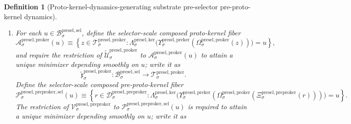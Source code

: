 \documentclass[11pt]{article}
\newcommand{\PreSectionSelectorBody}[1]{\mathcal B_{#1}^{\mathrm{presel,sel}}}
\newcommand{\KernelSpace}[1]{\mathcal H_{#1}^{\mathrm{presel,ker}}}
\newcommand{\KernelBody}[1]{\mathcal K_{#1}^{\mathrm{presel,ker}}}
\newcommand{\KernelProj}[1]{\Lambda_{#1}^{\mathrm{presel,ker}}}
\newcommand{\KernelFiber}[2]{\mathcal J_{#1}^{\mathrm{presel,ker}}(#2)}
\newcommand{\PreKernelProj}[1]{\Upsilon_{#1}^{\mathrm{presel,preker}}}
\newcommand{\PreKernelFiber}[2]{\mathcal U_{#1}^{\mathrm{presel,preker}}(#2)}
\newcommand{\ProtoKernelBody}[1]{\mathcal T_{#1}^{\mathrm{presel,proker}}}
\newcommand{\ProtoKernelProj}[1]{\Omega_{#1}^{\mathrm{presel,proker}}}
\newcommand{\ProtoKernelSelectorFiber}[2]{\mathcal A_{#1}^{\mathrm{presel,proker}}(#2)}
\newcommand{\PreProtoKernelBody}[1]{\mathcal D_{#1}^{\mathrm{presel,preproker}}}
\newcommand{\PreProtoKernelProj}[1]{\Xi_{#1}^{\mathrm{presel,preproker}}}
\newcommand{\PreProtoKernelFunctional}[1]{\mathscr V_{#1}^{\mathrm{presel,preproker}}}
\newcommand{\PreProtoKernelKernelFiber}[2]{\mathcal N_{#1}^{\mathrm{presel,preproker,ker}}(#2)}
\newcommand{\PreProtoKernelKernelMin}[1]{\mathfrak b_{#1}^{\mathrm{presel,preproker}}}
\newcommand{\PreProtoKernelSelectorFiber}[2]{\mathcal P_{#1}^{\mathrm{presel,preproker,sel}}(#2)}
\newcommand{\InducedKernelFunctional}[1]{\widetilde{\mathscr R}_{#1}^{\mathrm{presel,ker}}}
\newcommand{\InducedKernelMinLift}[1]{\widetilde{\mathfrak r}_{#1}^{\mathrm{presel,ker}}}
\newcommand{\InducedPreKernelFunctional}[1]{\widetilde{\mathscr S}_{#1}^{\mathrm{presel,preker}}}
\newcommand{\InducedPreKernelMinLift}[1]{\widetilde{\mathfrak s}_{#1}^{\mathrm{presel,preker}}}
\newcommand{\InducedProtoKernelFunctional}[1]{\widetilde{\mathscr U}_{#1}^{\mathrm{presel,proker}}}
\newcommand{\InducedProtoKernelKernelMin}[1]{\widetilde{\mathfrak w}_{#1}^{\mathrm{presel,proker}}}
\newcommand{\InducedProtoKernelSelectorMin}[1]{\widetilde{\mathfrak x}_{#1}^{\mathrm{presel,proker}}}
\newtheorem{definition}{Definition}
\begin{document}
\begin{definition}[Proto-kernel-dynamics-generating substrate pre-selector pre-proto-kernel dynamics]
\begin{enumerate}
    \[
    \InducedProtoKernelKernelMin{\sigma}:\KernelBody{\sigma}\to\ProtoKernelBody{\sigma}.
    \]
    Define the current-kernel-scale composed pre-proto-kernel fiber
    \[
    \PreProtoKernelKernelFiber{\sigma}{w}
    \equiv
    \left\{
    r\in\PreProtoKernelBody{\sigma}:
    \PreKernelProj{\sigma}\bigl(\ProtoKernelProj{\sigma}(\PreProtoKernelProj{\sigma}(r))\bigr)=w
    \right\}.
    \]
    The restriction of \(\PreProtoKernelFunctional{\sigma}\) to \(\PreProtoKernelKernelFiber{\sigma}{w}\) is required to attain a unique minimizer depending smoothly on \(w\); write it as
    \[
    \PreProtoKernelKernelMin{\sigma}:\KernelBody{\sigma}\to\PreProtoKernelBody{\sigma}.
    \]
    Define the induced current kernel functional
    \[
    \InducedKernelFunctional{\sigma}:\KernelSpace{\sigma}\to[0,\infty)
    \]
    by
    \[
    \InducedKernelFunctional{\sigma}(w)
    \equiv
    \InducedPreKernelFunctional{\sigma}\bigl(\InducedPreKernelMinLift{\sigma}(w)\bigr)
    =
    \min_{q\in\PreKernelFiber{\sigma}{w}}
    \InducedPreKernelFunctional{\sigma}(q)
    \qquad
    \text{for every }
    w\in\KernelBody{\sigma}.
    \]
    This function is required to be smooth on the ambient current kernel state space, and for every \(u\in\PreSectionSelectorBody{\sigma}\), its restriction to \(\KernelFiber{\sigma}{u}\) is required to be strictly convex and to attain a unique minimizer depending smoothly on \(u\); write it as
    \[
    \InducedKernelMinLift{\sigma}:\PreSectionSelectorBody{\sigma}\to\KernelBody{\sigma}.
    \]
    \item For each \(u\in\PreSectionSelectorBody{\sigma}\), define the selector-scale composed proto-kernel fiber
    \[
    \ProtoKernelSelectorFiber{\sigma}{u}
    \equiv
    \left\{
    z\in\ProtoKernelBody{\sigma}:
    \KernelProj{\sigma}\bigl(\PreKernelProj{\sigma}(\ProtoKernelProj{\sigma}(z))\bigr)=u
    \right\},
    \]
    and require the restriction of \(\InducedProtoKernelFunctional{\sigma}\) to \(\ProtoKernelSelectorFiber{\sigma}{u}\) to attain a unique minimizer depending smoothly on \(u\); write it as
    \[
    \InducedProtoKernelSelectorMin{\sigma}:\PreSectionSelectorBody{\sigma}\to\ProtoKernelBody{\sigma}.
    \]
    Define the selector-scale composed pre-proto-kernel fiber
    \[
    \PreProtoKernelSelectorFiber{\sigma}{u}
    \equiv
    \left\{
    r\in\PreProtoKernelBody{\sigma}:
    \KernelProj{\sigma}\bigl(\PreKernelProj{\sigma}(\ProtoKernelProj{\sigma}(\PreProtoKernelProj{\sigma}(r)))\bigr)=u
    \right\}.
    \]
    The restriction of \(\PreProtoKernelFunctional{\sigma}\) to \(\PreProtoKernelSelectorFiber{\sigma}{u}\) is required to attain a unique minimizer depending smoothly on \(u\); write it as

\end{enumerate}
\end{definition}
\end{document}
